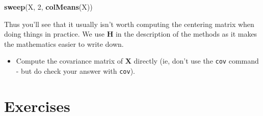 \documentclass[
]{book}
\newenvironment{Shaded}{\begin{snugshade}}{\end{snugshade}}
\newcommand{\DecValTok}[1]{\textcolor[rgb]{0.00,0.00,0.81}{#1}}
\newcommand{\FunctionTok}[1]{\textcolor[rgb]{0.13,0.29,0.53}{\textbf{#1}}}
\newcommand{\NormalTok}[1]{#1}
\providecommand{\tightlist}{%
  \setlength{\itemsep}{0pt}\setlength{\parskip}{0pt}}
\theoremstyle{definition}
\theoremstyle{definition}
\theoremstyle{definition}
\theoremstyle{definition}
\theoremstyle{remark}
\begin{document}
\begin{Shaded}
\begin{Highlighting}[]
\FunctionTok{sweep}\NormalTok{(X, }\DecValTok{2}\NormalTok{, }\FunctionTok{colMeans}\NormalTok{(X))}
\end{Highlighting}
\end{Shaded}

Thus you'll see that it usually isn't worth computing the centering matrix when doing things in practice. We use \(\mathbf H\) in the description of the methods as it makes the mathematics easier to write down.

\begin{itemize}
\tightlist
\item
  Compute the covariance matrix of \(\mathbf X\) directly (ie, don't use the \texttt{cov} command - but do check your answer with \texttt{cov}).
\end{itemize}

\section{Exercises}\label{exercises-ch2}
\end{document}
